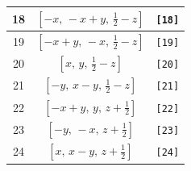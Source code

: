 \documentclass[fleqn,8pt]{jsarticle}
\begin{document}
\begin{longtable}{ccc}
18 & $\left[ - x,\, - x + y,\, \frac{1}{2} - z \right]$ & {\tt [18]} \\ \hline
19 & $\left[ - x + y,\, - x,\, \frac{1}{2} - z \right]$ & {\tt [19]} \\ \hline
20 & $\left[ x,\, y,\, \frac{1}{2} - z \right]$ & {\tt [20]} \\ \hline
21 & $\left[ - y,\, x - y,\, \frac{1}{2} - z \right]$ & {\tt [21]} \\ \hline
22 & $\left[ - x + y,\, y,\, z + \frac{1}{2} \right]$ & {\tt [22]} \\ \hline
23 & $\left[ - y,\, - x,\, z + \frac{1}{2} \right]$ & {\tt [23]} \\ \hline
24 & $\left[ x,\, x - y,\, z + \frac{1}{2} \right]$ & {\tt [24]} \\
\end{longtable}
\end{document}
